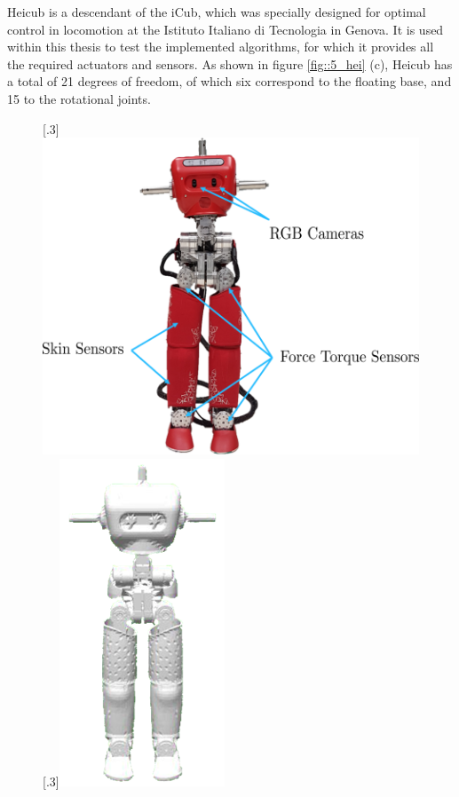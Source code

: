 \label{sec::5_he}
Heicub is a descendant of the iCub, which was specially designed for optimal control in locomotion at the Istituto Italiano di Tecnologia in Genova. It is used within this thesis to test the implemented algorithms, for which it provides all the required actuators and sensors. As shown in figure \ref{fig::5_hei} (c), Heicub has a total of 21 degrees of freedom, of which six correspond to the floating base, and 15 to the rotational joints. 
\begin{figure}[h!]
	\centering
	[.3\linewidth]{\includegraphics[scale=.35]{chapters/05_heicub_our_humanoid_robot/img/heicub.png}}
	[.3\linewidth]{\includegraphics[scale=.35]{chapters/05_heicub_our_humanoid_robot/img/gazebo_heicub.png}}

\end{figure}
